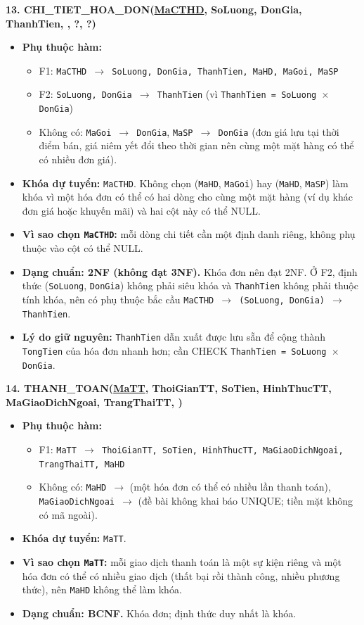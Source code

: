 \documentclass[11pt, a4paper]{article}
\newcommand{\pk}[1]{\bgroup\ULdepth=1.8pt\uline{#1}\egroup}
\newcommand{\fk}[1]{\bgroup\ULdepth=1.8pt\dashuline{#1}\egroup}
\begin{document}
\textbf{13. CHI\_TIET\_HOA\_DON(\pk{MaCTHD}, SoLuong, DonGia, ThanhTien, \fk{MaHD}, \fk{MaGoi}?, \fk{MaSP}?)}
\begin{itemize}
    \item \textbf{Phụ thuộc hàm:}
    \begin{itemize}
        \item F1: \texttt{MaCTHD $\rightarrow$ SoLuong, DonGia, ThanhTien, MaHD, MaGoi, MaSP}
        \item F2: \texttt{SoLuong, DonGia $\rightarrow$ ThanhTien} (vì \texttt{ThanhTien = SoLuong $\times$ DonGia})
        \item Không có: \texttt{MaGoi $\rightarrow$ DonGia}, \texttt{MaSP $\rightarrow$ DonGia} (đơn giá lưu tại thời điểm bán, giá niêm yết đổi theo thời gian nên cùng một mặt hàng có thể có nhiều đơn giá).
    \end{itemize}
    \item \textbf{Khóa dự tuyển:} \texttt{MaCTHD}. Không chọn (\texttt{MaHD}, \texttt{MaGoi}) hay (\texttt{MaHD}, \texttt{MaSP}) làm khóa vì một hóa đơn có thể có hai dòng cho cùng một mặt hàng (ví dụ khác đơn giá hoặc khuyến mãi) và hai cột này có thể NULL.
    \item \textbf{Vì sao chọn \texttt{MaCTHD}:} mỗi dòng chi tiết cần một định danh riêng, không phụ thuộc vào cột có thể NULL.
    \item \textbf{Dạng chuẩn: 2NF (không đạt 3NF).} Khóa đơn nên đạt 2NF. Ở F2, định thức (\texttt{SoLuong}, \texttt{DonGia}) không phải siêu khóa và \texttt{ThanhTien} không phải thuộc tính khóa, nên có phụ thuộc bắc cầu \texttt{MaCTHD $\rightarrow$ (SoLuong, DonGia) $\rightarrow$ ThanhTien}.
    \item \textbf{Lý do giữ nguyên:} \texttt{ThanhTien} dẫn xuất được lưu sẵn để cộng thành \texttt{TongTien} của hóa đơn nhanh hơn; cần CHECK \texttt{ThanhTien = SoLuong $\times$ DonGia}.
\end{itemize}

\textbf{14. THANH\_TOAN(\pk{MaTT}, ThoiGianTT, SoTien, HinhThucTT, MaGiaoDichNgoai, TrangThaiTT, \fk{MaHD})}
\begin{itemize}
    \item \textbf{Phụ thuộc hàm:}
    \begin{itemize}
        \item F1: \texttt{MaTT $\rightarrow$ ThoiGianTT, SoTien, HinhThucTT, MaGiaoDichNgoai, TrangThaiTT, MaHD}
        \item Không có: \texttt{MaHD $\rightarrow$} (một hóa đơn có thể có nhiều lần thanh toán), \texttt{MaGiaoDichNgoai $\rightarrow$} (đề bài không khai báo UNIQUE; tiền mặt không có mã ngoài).
    \end{itemize}
    \item \textbf{Khóa dự tuyển:} \texttt{MaTT}.
    \item \textbf{Vì sao chọn \texttt{MaTT}:} mỗi giao dịch thanh toán là một sự kiện riêng và một hóa đơn có thể có nhiều giao dịch (thất bại rồi thành công, nhiều phương thức), nên \texttt{MaHD} không thể làm khóa.
    \item \textbf{Dạng chuẩn: BCNF.} Khóa đơn; định thức duy nhất là khóa.
\end{itemize}
\end{document}
